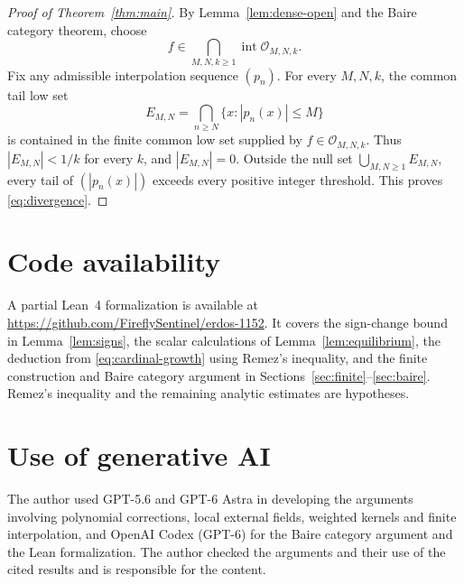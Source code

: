 \documentclass[11pt]{article}
\theoremstyle{definition}
\numberwithin{equation}{section}
\begin{document}
\begin{proof}[Proof of Theorem~\ref{thm:main}]
By Lemma~\ref{lem:dense-open} and the Baire category theorem, choose
\[
 f\in\bigcap_{M,N,k\ge1}\operatorname{int}\mathcal O_{M,N,k}.
\]
Fix any admissible interpolation sequence \((p_n)\).
For every \(M,N,k\), the common tail low set
\[
 E_{M,N}=\bigcap_{n\ge N}\{x:|p_n(x)|\le M\}
\]
is contained in the finite common low set supplied by
\(f\in\mathcal O_{M,N,k}\). Thus \(|E_{M,N}|<1/k\) for every
\(k\), and \(|E_{M,N}|=0\).
Outside the null set \(\bigcup_{M,N\ge1}E_{M,N}\), every tail
of \((|p_n(x)|)\) exceeds every positive integer threshold.
This proves \eqref{eq:divergence}.
\end{proof}

\section*{Code availability}

A partial Lean~4 formalization is available at
\url{https://github.com/FireflySentinel/erdos-1152}.
It covers the sign-change bound in Lemma~\ref{lem:signs}, the scalar
calculations of Lemma~\ref{lem:equilibrium}, the deduction from
\eqref{eq:cardinal-growth} using Remez's inequality, and the finite
construction and Baire category argument in
Sections~\ref{sec:finite}--\ref{sec:baire}.
Remez's inequality and the remaining analytic estimates are hypotheses.

\section*{Use of generative AI}

The author used GPT-5.6 and GPT-6 Astra in developing the arguments
involving polynomial corrections, local external fields, weighted kernels
and finite interpolation, and OpenAI Codex (GPT-6) for the Baire category
argument and the Lean formalization. The author checked the arguments and
their use of the cited results and is responsible for the content.
\end{document}

